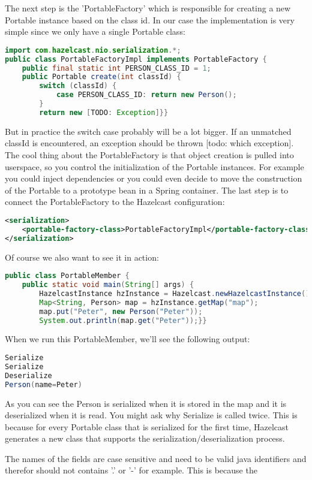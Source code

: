 The next step is the 'PortableFactory' which is responsible for creating a new Portable instance based on the class id. In our case the implementation is very simple since we only have a single Portable class:
\begin{lstlisting}[language=java]
import com.hazelcast.nio.serialization.*;
public class PortableFactoryImpl implements PortableFactory {
    public final static int PERSON_CLASS_ID = 1;
    public Portable create(int classId) {
        switch (classId) {
            case PERSON_CLASS_ID: return new Person();
        }
        return new [TODO: Exception]}}
\end{lstlisting}
But in practice the switch case probably will be a lot bigger. If an unmatched classId is encountered, an exception should be thrown [todo: which exception]. The cool thing about the PortableFactory is that object creation is pulled into userspace, so you control the initialization of the Portable instances. For example you could inject dependencies or you could even decide to move the construction of the Portable to a prototype bean in a Spring container. The last step is to connect the PortableFactory to the Hazelcast configuration:
\begin{lstlisting}[language=xml]
<serialization>
    <portable-factory-class>PortableFactoryImpl</portable-factory-class>
</serialization>
\end{lstlisting}
Of course we also want to see it in action:
\begin{lstlisting}[language=java]
public class PortableMember {
    public static void main(String[] args) {
        HazelcastInstance hzInstance = Hazelcast.newHazelcastInstance();
        Map<String, Person> map = hzInstance.getMap("map");
        map.put("Peter", new Person("Peter"));
        System.out.println(map.get("Peter"));}}
\end{lstlisting}
When we run this PortableMember, we'll see the following output:
\begin{lstlisting}[language=java]
Serialize
Serialize
Deserialize
Person(name=Peter)
\end{lstlisting}
As you can see the Person is serialized when it is stored in the map and it is deserialized when it is read. You might ask why Serialize is called twice. This is because for every Portable class that is serialized for the first time, Hazelcast generates a new class that supports the serialization/deserialization process. 

The names of the fields are case sensitive and need to be valid java identifiers and therefor should not contains '.' or '-' for example. This is because the 

